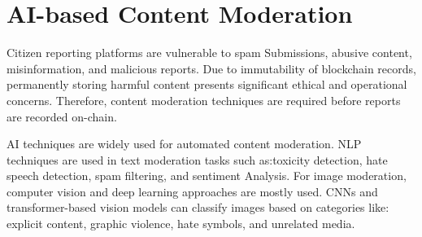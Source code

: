 \section{AI-based Content Moderation}

Citizen reporting platforms are vulnerable to spam Submissions, abusive content, misinformation, and malicious reports. Due to immutability of blockchain records, permanently storing harmful content presents significant ethical and operational concerns. Therefore, content moderation techniques are required before reports are recorded on-chain. 

\ac{AI} techniques are widely used for automated content moderation. \ac{NLP} techniques are used in text moderation tasks such as:toxicity detection, hate speech detection, spam filtering, and sentiment Analysis. For image moderation, computer vision and deep learning approaches are mostly used. \ac{CNN}s and transformer-based vision models can classify images based on categories like: explicit content, graphic violence, hate symbols, and unrelated media. 


